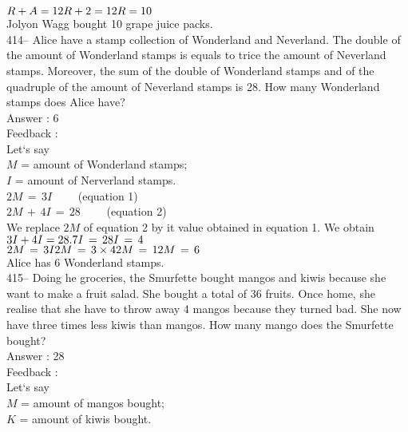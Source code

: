 \documentclass[letterpaper, 12pt]{article}
\begin{document}
$R+A=12\\
R+2=12\\
R=10$\\
Jolyon Wagg bought 10 grape juice packs.\\

414-- Alice have a stamp collection of Wonderland and Neverland. The double of the amount of Wonderland stamps is equals to trice the amount of Neverland stamps. Moreover, the sum of the double of Wonderland stamps and of the quadruple of the amount of Neverland stamps is 28. How many Wonderland stamps does Alice have?\\

Answer : 6\\

Feedback : \\
Let`s say\\
$M$ = amount of Wonderland stamps;\\
$I$ = amount of Nerverland stamps.\\

$2M\,=\,3I \qquad $ (equation 1)\\
$2M\,+\,4I\,=\,28 \qquad $ (equation 2)\\
We replace $2M$ of equation 2 by it value obtained in equation 1. We obtain $3I+4I=28.\\
7I\,=\,28\\
I\,=\,4$\\

$2M\,=\,3I\\
2M\,=\,3\times4\\
2M\,=\,12\\
M\,=\,6$\\
Alice has 6 Wonderland stamps.\\

415-- Doing he groceries, the Smurfette bought mangos and kiwis because she want to make a fruit salad. She bought a total of 36 fruits. Once home, she realise that she have to throw away 4 mangos because they turned bad. She now have three times less kiwis than mangos. How many mango does the Smurfette bought?\\


Answer : 28\\

Feedback : \\
Let`s say\\
$M$ = amount of mangos bought;\\
$K$ = amount of kiwis bought.\\
\end{document}

